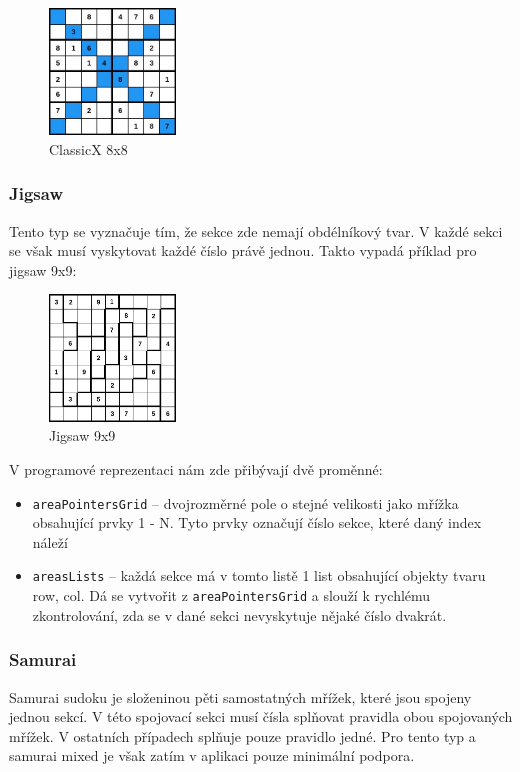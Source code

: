 \documentclass[a4paper,oneside,12pt]{report}
\begin{document}
\begin{figure}[H]
   \centering
   \includegraphics[width=0.3\textwidth]{../img/8x8DiagSudoku.jpg}
   \caption[ClassicX 8x8]{ClassicX 8x8}
   \label{fig:8x8DiagSudoku}
\end{figure}

\subsubsection{Jigsaw}
Tento typ se vyznačuje tím, že sekce zde nemají obdélníkový tvar. V každé sekci se však musí vyskytovat každé číslo právě jednou. Takto vypadá příklad pro jigsaw 9x9:

\begin{figure}[H]
   \centering
   \includegraphics[width=0.3\textwidth]{../img/9x9jigsaw.jpg}
   \caption[Jigsaw 9x9]{Jigsaw 9x9}
   \label{fig:9x9jigsaw}
\end{figure}

V programové reprezentaci nám zde přibývají dvě proměnné:
\begin{itemize}
   \item \texttt{areaPointersGrid} -- dvojrozměrné pole o stejné velikosti jako mřížka obsahující prvky 1 - N. Tyto prvky označují číslo sekce, které daný index náleží
   \item \texttt{areasLists} -- každá sekce má v tomto listě 1 list obsahující objekty tvaru {row, col}. Dá se vytvořit z \texttt{areaPointersGrid} a slouží k rychlému zkontrolování, zda se v dané sekci nevyskytuje nějaké číslo dvakrát.
\end{itemize}

\subsubsection{Samurai}
Samurai sudoku je složeninou pěti samostatných mřížek, které jsou spojeny jednou sekcí. V této spojovací sekci musí čísla splňovat pravidla obou spojovaných mřížek. V ostatních případech splňuje pouze pravidlo jedné. Pro tento typ a samurai mixed je však zatím v aplikaci pouze minimální podpora.
\end{document}
